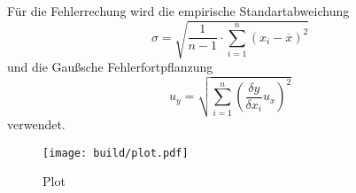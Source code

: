 Für die Fehlerrechung wird die empirische Standartabweichung
\begin{equation}
  \sigma = \sqrt{\frac{1}{n-1} \cdot \sum_{i=1}^n(x_i-\overline{x})^2}
  \label{eqn:Stdabweichung}
\end{equation}
und die Gaußsche Fehlerfortpflanzung
\begin{equation}
  u_y = \sqrt{\sum_{i=1}^n\left(\frac{\delta y}{\delta x_i}u_x\right)^2}
  \label{eqn:gauß}
\end{equation}
verwendet.
\begin{figure}
  \centering
  \texttt{[image: build/plot.pdf]}
  \caption{Plot}
  \label{fig:plot}
\end{figure}
